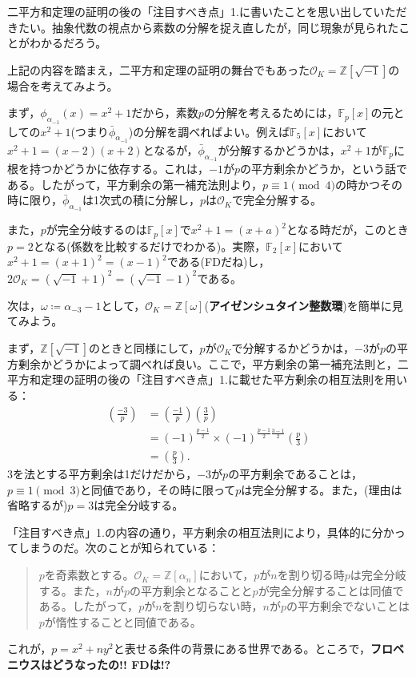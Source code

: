 二平方和定理の証明の後の「注目すべき点」1.に書いたことを思い出していただきたい。抽象代数の視点から素数の分解を捉え直したが，同じ現象が見られたことがわかるだろう。

上記の内容を踏まえ，二平方和定理の証明の舞台でもあった$\mathcal{O}_K=\mathbb{Z}[\sqrt{-1}]$の場合を考えてみよう。

まず，$\phi_{\alpha_{-1}}(x)=x^2+1$だから，素数$p$の分解を考えるためには，$\mathbb{F}_p[x]$の元としての$x^2+1$(つまり$\bar{\phi}_{\alpha_{-1}}$)の分解を調べればよい。例えば$\mathbb{F}_5[x]$において$x^2+1=(x-2)(x+2)$となるが，$\bar{\phi}_{\alpha_{-1}}$が分解するかどうかは，$x^2+1$が$\mathbb{F}_p$に根を持つかどうかに依存する。これは，$-1$が$p$の平方剰余かどうか，という話である。したがって，平方剰余の第一補充法則より，$p\equiv 1\pmod{4}$の時かつその時に限り，$\bar{\phi}_{\alpha_{-1}}$は1次式の積に分解し，$p$は$\mathcal{O}_K$で完全分解する。

また，$p$が完全分岐するのは$\mathbb{F}_p[x]$で$x^2+1=(x+a)^2$となる時だが，このとき$p=2$となる(係数を比較するだけでわかる)。実際，$\mathbb{F}_2[x]$において$x^2+1=(x+1)^2=(x-1)^2$である(\textsf{FD}だね)し，$2\mathcal{O}_K=(\sqrt{-1}+1)^2=(\sqrt{-1}-1)^2$である。

次は，$\omega\coloneqq\alpha_{-3}-1$として，$\mathcal{O}_K=\mathbb{Z}[\omega]$(\textbf{アイゼンシュタイン整数環})を簡単に見てみよう。

まず，$\mathbb{Z}[\sqrt{-1}]$のときと同様にして，$p$が$\mathcal{O}_K$で分解するかどうかは，$-3$が$p$の平方剰余かどうかによって調べれば良い。ここで，平方剰余の第一補充法則と，二平方和定理の証明の後の「注目すべき点」1.に載せた平方剰余の相互法則を用いる：
\begin{align*}
    \left(\frac{-3}{p}\right)&=\left(\frac{-1}{p}\right)\left(\frac{3}{p}\right)\\
    &=(-1)^{\frac{p-1}{2}}\times (-1)^{\frac{p-1}{2}\frac{3-1}{2}}\left(\frac{p}{3}\right)\\
    &=\left(\frac{p}{3}\right).
\end{align*}
3を法とする平方剰余は1だけだから，$-3$が$p$の平方剰余であることは，$p\equiv 1\pmod{3}$と同値であり，その時に限って$p$は完全分解する。また，(理由は省略するが)$p=3$は完全分岐する。

「注目すべき点」1.の内容の通り，平方剰余の相互法則により，具体的に分かってしまうのだ。次のことが知られている：
\begin{quote}
    $p$を奇素数とする。$\mathcal{O}_K=\mathbb{Z}[\alpha_n]$において，$p$が$n$を割り切る時$p$は完全分岐する。また，$n$が$p$の平方剰余となることと$p$が完全分解することは同値である。したがって，$p$が$n$を割り切らない時，$n$が$p$の平方剰余でないことは$p$が惰性することと同値である。
\end{quote}

これが，$p=x^2+ny^2$と表せる条件の背景にある世界である。ところで，\textbf{フロベニウスはどうなったの!! \textsf{FD}は!?}










